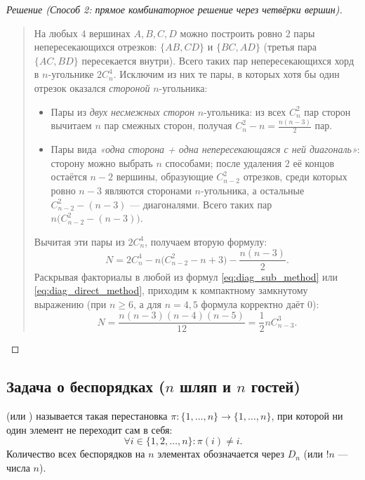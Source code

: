 \begin{proof}[Решение (Способ 2: прямое комбинаторное решение через четвёрки вершин)]
\begin{quote}
        На любых $4$ вершинах $A, B, C, D$ можно построить ровно $2$ пары 
        непересекающихся отрезков: $\{AB, CD\}$ и $\{BC, AD\}$ (третья пара 
        $\{AC, BD\}$ пересекается внутри). Всего таких пар непересекающихся 
        хорд в $n$-угольнике $2 C_n^4$. Исключим из них те пары, в которых 
        хотя бы один отрезок оказался \emph{стороной} $n$-угольника:
        \begin{itemize}
            \item Пары из \emph{двух несмежных сторон} $n$-угольника: из 
            всех $C_n^2$ пар сторон вычитаем $n$ пар смежных сторон, получая 
            $C_n^2 - n = \frac{n(n - 3)}{2}$ пар.
            \item Пары вида \emph{«одна сторона + одна непересекающаяся с 
            ней диагональ»}: сторону можно выбрать $n$ способами; после 
            удаления $2$ её концов остаётся $n - 2$ вершины, образующие 
            $C_{n-2}^2$ отрезков, среди которых ровно $n - 3$ являются 
            сторонами $n$-угольника, а остальные $C_{n-2}^2 - (n - 3)$ --- 
            диагоналями. Всего таких пар $n\bigl(C_{n-2}^2 - (n - 3)\bigr)$.
        \end{itemize}
        Вычитая эти пары из $2 C_n^4$, получаем вторую формулу:
        \begin{equation} \label{eq:diag_direct_method}
            N = 2 C_n^4 - n\bigl(C_{n-2}^2 - n + 3\bigr) - \frac{n(n - 3)}{2}. 
            \tag{9}
        \end{equation}
        Раскрывая факториалы в любой из формул \eqref{eq:diag_sub_method} 
        или \eqref{eq:diag_direct_method}, приходим к компактному 
        замкнутому выражению (при $n \ge 6$, а для $n = 4, 5$ формула 
        корректно даёт $0$):
        \begin{equation} \label{eq:diag_closed_form}
            N = \frac{n(n - 3)(n - 4)(n - 5)}{12} = \frac{1}{2} n C_{n-3}^3. 
            \tag{10}
        \end{equation}
    \end{quote}
\end{proof}

\subsection{Задача о беспорядках ($n$ шляп и $n$ гостей)}

\begin{definition}
     (или ) 
    называется такая перестановка $\pi: \{1, \dots, n\} \to \{1, \dots, n\}$, 
    при которой ни один элемент не переходит сам в себя:
    \[
        \forall i \in \{1, 2, \dots, n\} : \pi(i) \neq i.
    \]
    Количество всех беспорядков на $n$ элементах обозначается через $D_n$ 
    (или $!n$ ---  числа $n$).
\end{definition}

